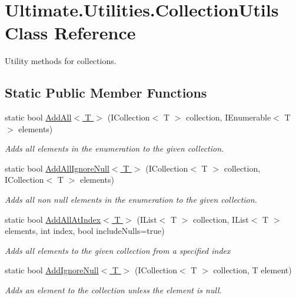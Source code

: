 \hypertarget{class_ultimate_1_1_utilities_1_1_collection_utils}{}\section{Ultimate.\+Utilities.\+Collection\+Utils Class Reference}
\label{class_ultimate_1_1_utilities_1_1_collection_utils}


Utility methods for collections.  


\subsection*{Static Public Member Functions}
\begin{DoxyCompactItemize}
\item 
static bool \hyperlink{class_ultimate_1_1_utilities_1_1_collection_utils_a8f68d92988ad7a3390263ebd75b446d7}{Add\+All$<$ T $>$} (I\+Collection$<$ T $>$ collection, I\+Enumerable$<$ T $>$ elements)
\begin{DoxyCompactList}\small\item\em Adds all elements in the enumeration to the given collection. \end{DoxyCompactList}\item 
static bool \hyperlink{class_ultimate_1_1_utilities_1_1_collection_utils_a0eba0e76b7a163e1df31e95dcb667c6e}{Add\+All\+Ignore\+Null$<$ T $>$} (I\+Collection$<$ T $>$ collection, I\+Collection$<$ T $>$ elements)
\begin{DoxyCompactList}\small\item\em Adds all non null elements in the enumeration to the given collection. \end{DoxyCompactList}\item 
static bool \hyperlink{class_ultimate_1_1_utilities_1_1_collection_utils_ad05ace632a3f5c63cb1e29e2c9ba239c}{Add\+All\+At\+Index$<$ T $>$} (I\+List$<$ T $>$ collection, I\+List$<$ T $>$ elements, int index, bool include\+Nulls=true)
\begin{DoxyCompactList}\small\item\em Adds all elements to the given collection from a specified index \end{DoxyCompactList}\item 
static bool \hyperlink{class_ultimate_1_1_utilities_1_1_collection_utils_ae99786c2d73159dc8fe29ea584d3f0a9}{Add\+Ignore\+Null$<$ T $>$} (I\+Collection$<$ T $>$ collection, T element)
\begin{DoxyCompactList}\small\item\em Adds an element to the collection unless the element is null. \end{DoxyCompactList}\item 

\end{DoxyCompactItemize}
